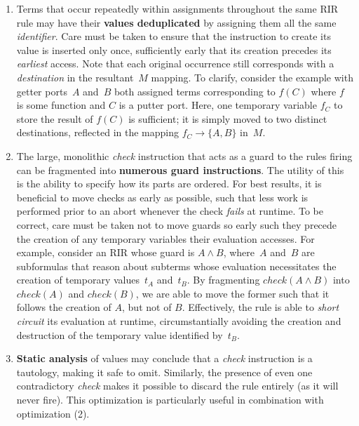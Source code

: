 \begin{enumerate}
	\item Terms that occur repeatedly within assignments throughout the same RIR rule may have their \textbf{values deduplicated} by assigning them all the same \textit{identifier}. Care must be taken to ensure that the instruction to create its value is inserted only once, sufficiently early that its creation precedes its \textit{earliest} access. Note that each original occurrence still corresponds with a \textit{destination} in the resultant~$M$ mapping. To clarify, consider the example with getter ports~$A$ and~$B$ both assigned terms corresponding to $f(C)$ where $f$ is some function and $C$ is a putter port. Here, one temporary variable $f_C$ to store the result of $f(C)$ is sufficient; it is simply moved to two distinct destinations, reflected in the mapping $f_C\rightarrow\{A,B\}$ in~$M$.
	
	\item The large, monolithic \textit{check} instruction that acts as a guard to the rules firing can be fragmented into \textbf{numerous guard instructions}. The utility of this is the ability to specify how its parts are ordered. For best results, it is beneficial to move checks as early as possible, such that less work is performed prior to an abort whenever the check \textit{fails} at runtime. To be correct, care must be taken not to move guards so early such they precede the creation of any temporary variables their evaluation accesses. For example, consider an RIR 
	whose guard is $A\wedge{}B$, where~$A$ and~$B$ are subformulas that reason about subterms whose evaluation necessitates the creation of temporary values~$t_A$ and~$t_B$. By fragmenting $check(A\wedge{}B)$ into $check(A)$ and $check(B)$, we are able to move the former such that it follows the creation of $A$, but not of $B$. Effectively, the rule is able to \textit{short circuit} its evaluation at runtime, circumstantially avoiding the creation and destruction of the temporary value identified by~$t_B$. 
	
	\item \textbf{Static analysis} of values may conclude that a \textit{check} instruction is a tautology, making it safe to omit. Similarly, the presence of even one contradictory \textit{check} makes it possible to discard the rule entirely (as it will never fire). This optimization is particularly useful in combination with optimization (2).
\end{enumerate}

